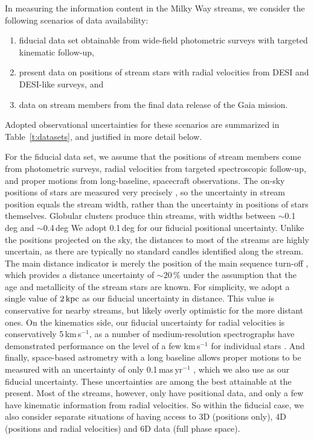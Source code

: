 \documentclass[modern]{aastex61}
\begin{document}
In measuring the information content in the Milky Way streams, we consider the following scenarios of data availability:
\begin{enumerate}
\item fiducial data set obtainable from wide-field photometric surveys with targeted kinematic follow-up,
\item present data on positions of stream stars with radial velocities from DESI and DESI-like surveys, and
\item data on stream members from the final data release of the Gaia mission.
\end{enumerate}
Adopted observational uncertainties for these scenarios are summarized in Table~\ref{t:datasets}, and justified in more detail below.

For the fiducial data set, we assume that the positions of stream members come from photometric surveys, radial velocities from targeted spectroscopic follow-up, and proper motions from long-baseline, spacecraft observations.
The on-sky positions of stars are measured very precisely \citep[for example, better than 100\,mas in SDSS,][]{pier2003}, so the uncertainty in stream position equals the stream width, rather than the uncertainty in positions of stars themselves.
Globular clusters produce thin streams, with widths between $\sim$0.1\,deg \citep[e.g., PS1A,][]{bernard2016} and $\sim$0.4\,deg \citep[e.g., Sangarius,][]{grillmair2017a}
We adopt 0.1\,deg for our fiducial positional uncertainty.
Unlike the positions projected on the sky, the distances to most of the streams are highly uncertain, as there are typically no standard candles identified along the stream.
The main distance indicator is merely the position of the main sequence turn-off \citep[e.g.,][]{bonaca2012}, which provides a distance uncertainty of $\sim20\,\%$ under the assumption that the age and metallicity of the stream stars are known.
For simplicity, we adopt a single value of $2\,\rm kpc$ as our fiducial uncertainty in distance.
This value is conservative for nearby streams, but likely overly optimistic for the more distant ones.
On the kinematics side, our fiducial uncertainty for radial velocities is conservatively 5\,km\,s$^{-1}$, as a number of medium-resolution spectrographs have demonstrated performance on the level of a few km\,s$^{-1}$ for individual stars \citep[e.g.,][]{sg}.
And finally, space-based astrometry with a long baseline allows proper motions to be measured with an uncertainty of only 0.1\,mas\,yr$^{-1}$ \citep{sohn2015}, which we also use as our fiducial uncertainty.
These uncertainties are among the best attainable at the present.
Most of the streams, however, only have positional data, and only a few have kinematic information from radial velocities.
So within the fiducial case, we also consider separate situations of having access to 3D (positions only), 4D (positions and radial velocities) and 6D data (full phase space).
\end{document}
